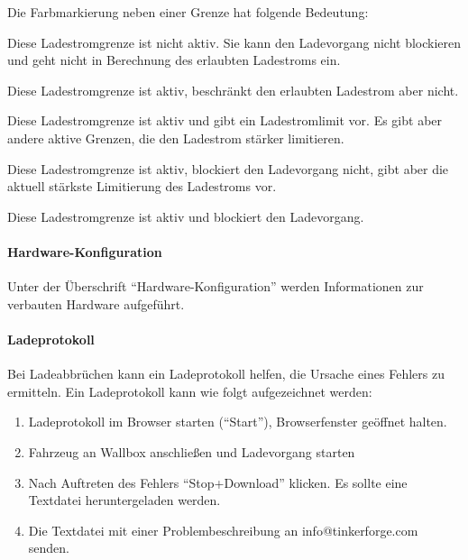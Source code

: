 \documentclass[a4paper,10pt]{article}
\begin{document}
\begin{multicols*}{2}
    Die Farbmarkierung neben einer Grenze hat folgende Bedeutung:
    \begin{description}[labelindent=0.5cm, leftmargin=0.5cm]
     \item[\textbf{\textcolor{mygray}{Grau}}] Diese Ladestromgrenze ist nicht aktiv. Sie kann den Ladevorgang nicht blockieren und geht nicht in Berechnung des erlaubten Ladestroms ein.
     \item[\textbf{\textcolor{mygreen}{Grün}}] Diese Ladestromgrenze ist aktiv, beschränkt den erlaubten Ladestrom aber nicht.
     \item[\textbf{\textcolor{myblue}{Blau}}] Diese Ladestromgrenze ist aktiv und gibt ein Ladestromlimit vor. Es gibt aber andere aktive Grenzen, die den Ladestrom stärker limitieren.
     \item[\textbf{\textcolor{myorange}{Gelb}}] Diese Ladestromgrenze ist aktiv, blockiert den Ladevorgang nicht, gibt aber die aktuell stärkste Limitierung des Ladestroms vor.
     \item[\textbf{\textcolor{myred}{Rot}}] Diese Ladestromgrenze ist aktiv und blockiert den Ladevorgang.
    \end{description}

    \vspace{-0.2cm}
    \paragraph{Hardware-Konfiguration}
    Unter der Überschrift \enquote{Hardware-Konfiguration} werden Informationen
    zur verbauten Hardware aufgeführt.

    \vspace{-0.2cm}
    \paragraph{Ladeprotokoll}
    Bei Ladeabbrüchen kann ein Ladeprotokoll
    helfen, die Ursache eines Fehlers zu ermitteln. Ein Ladeprotokoll kann
    wie folgt aufgezeichnet werden:
    \begin{enumerate}
        \item Ladeprotokoll im Browser starten (\enquote{Start}), Browserfenster geöffnet halten.
        \item Fahrzeug an Wallbox anschließen und Ladevorgang starten
        \item Nach Auftreten des Fehlers \enquote{Stop+Download} klicken. Es
        sollte eine Textdatei heruntergeladen werden.
        \item Die Textdatei mit einer Problembeschreibung an \nohyphens{info@tinkerforge.com} senden.
    \end{enumerate}


\end{multicols*}
\end{document}
